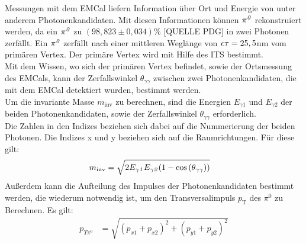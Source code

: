 Messungen mit dem EMCal liefern Information {\"u}ber Ort und Energie von unter anderem Photonenkandidaten. Mit diesen Informationen k{\"o}nnen ${\it \pi^{0}}$ rekonstruiert werden, da ein ${\it \pi^{0}}$ zu $\left( 98,823\pm0,034\right)\%$ [QUELLE PDG] in zwei Photonen zerf{\"a}llt. Ein ${\it \pi^{0}}$ zerf{\"a}llt nach einer mittleren Wegl{\"a}nge von ${\it c\tau} = 25,5$nm vom prim{\"a}ren Vertex. Der prim{\"a}re Vertex wird mit Hilfe des ITS bestimmt. \\
Mit dem Wissen, wo sich der prim{\"a}ren Vertex befindet, sowie der Ortsmessung des EMCals, kann der Zerfallswinkel $\theta_{\gamma\gamma}$ zwischen zwei Photonenkandidaten, die mit dem EMCal detektiert wurden, bestimmt werden. \\ 
Um die invariante Masse $m_{\text{inv}}$ zu berechnen, sind die Energien $E_{\gamma1}$ und $E_{\gamma2}$ der beiden Photonenkandidaten, sowie der Zerfallswinkel $\theta_{\gamma\gamma}$ erforderlich. \\
Die Zahlen in den Indizes beziehen sich dabei auf die Nummerierung der beiden Photonen. Die Indizes x und y beziehen sich auf die Raumrichtungen. F{\"u}r diese gilt:
\begin{align}
m_{\text{inv}} &= \sqrt{2E_{\gamma\it{1}}E_{\gamma\it{2}}(1-\cos\left( \theta_{\gamma\gamma}\right) )} \label{eq_invmass}
\end{align}
Au{\ss}erdem kann die Aufteilung des Impulses der Photonenkandidaten bestimmt werden, die wiederum notwendig ist, um den Transversalimpuls $p_\text{T}$ des $\pi^{0}$ zu Berechnen. Es gilt:
\begin{align}
p_{T\pi^{0}} &= \sqrt{\left(p_{x1}+p_{x2}\right)^{2} +\left(p_{y1}+p_{y2}\right)^{2}} \label{eq_pt}
\end{align}
